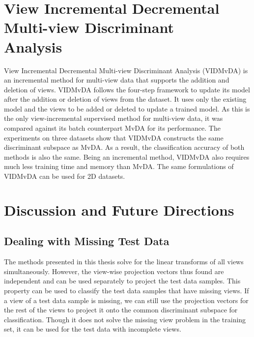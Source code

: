 






\section[View Incremental Decremental Multi-view Discriminant Analysis]{View Incremental Decremental Multi-view Discriminant\\ Analysis}
\label{sec:Conc_VIDMvDA}
View Incremental Decremental Multi-view Discriminant Analysis (VIDMvDA) is an incremental method for multi-view data that supports the addition and deletion of views. VIDMvDA follows the four-step framework to update its model after the addition or deletion of views from the dataset. It uses only the existing model and the views to be added or deleted to update a trained model. As this is the only view-incremental supervised method for multi-view data, it was compared against its batch counterpart MvDA for its performance. The experiments on three datasets show that VIDMvDA constructs the same discriminant subspace as MvDA. As a result, the classification accuracy of both methods is also the same. Being an incremental method, VIDMvDA also requires much less training time and memory than MvDA. The same formulations of VIDMvDA can be used for 2D datasets.











\section{Discussion and Future Directions}
\label{sec:FutureWork}
\subsection*{Dealing with Missing Test Data}
The methods presented in this thesis solve for the linear transforms of all views simultaneously. However, the view-wise projection vectors thus found are independent and can be used separately to project the test data samples. This property can be used to classify the test data samples that have missing views. If a view of a test data sample is missing, we can still use the projection vectors for the rest of the views to project it onto the common discriminant subspace for classification. Though it does not solve the missing view problem in the training set, it can be used for the test data with incomplete views.

